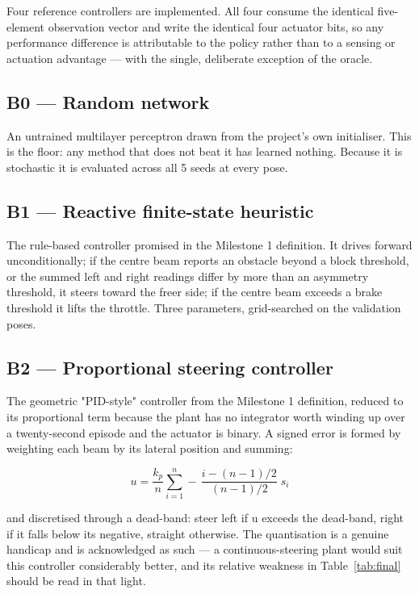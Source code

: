 \documentclass[conference]{IEEEtran}
\begin{document}
\label{sec:baselines}

Four reference controllers are implemented. All four consume the identical five-element observation vector and write the identical four actuator bits, so any performance difference is attributable to the policy rather than to a sensing or actuation advantage — with the single, deliberate exception of the oracle.

\subsection{B0 — Random network}

An untrained multilayer perceptron drawn from the project's own initialiser. This is the floor: any method that does not beat it has learned nothing. Because it is stochastic it is evaluated across all 5 seeds at every pose.

\subsection{B1 — Reactive finite-state heuristic}

The rule-based controller promised in the Milestone 1 definition. It drives forward unconditionally; if the centre beam reports an obstacle beyond a block threshold, or the summed left and right readings differ by more than an asymmetry threshold, it steers toward the freer side; if the centre beam exceeds a brake threshold it lifts the throttle. Three parameters, grid-searched on the validation poses.

\subsection{B2 — Proportional steering controller}

The geometric "PID-style" controller from the Milestone 1 definition, reduced to its proportional term because the plant has no integrator worth winding up over a twenty-second episode and the actuator is binary. A signed error is formed by weighting each beam by its lateral position and summing:

\begin{equation}
u = \frac{k_p}{n}\sum_{i=1}^{n} -\,\frac{i - (n-1)/2}{(n-1)/2}\; s_i
\end{equation}

and discretised through a dead-band: steer left if u exceeds the dead-band, right if it falls below its negative, straight otherwise. The quantisation is a genuine handicap and is acknowledged as such — a continuous-steering plant would suit this controller considerably better, and its relative weakness in Table~\ref{tab:final} should be read in that light.
\end{document}
